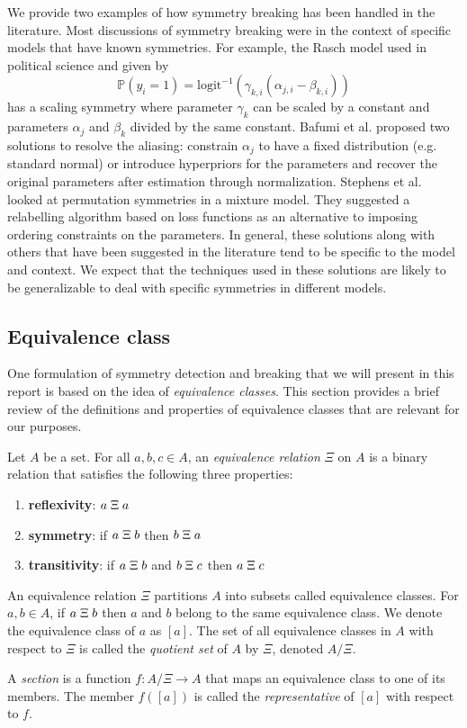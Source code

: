 We provide two examples of how symmetry breaking has been handled in the literature. Most discussions of symmetry breaking were in the context of specific models that have known symmetries. For example, the Rasch model used in political science and given by
\[
\mathbb{P}(y_i=1) = \text{logit}^{-1}\left(\gamma_{k,i}(\alpha_{j,i}-\beta_{k,i})\right)
\]
has a scaling symmetry where parameter $\gamma_k$ can be scaled by a constant and parameters $\alpha_j$ and $\beta_k$ divided by the same constant. Bafumi et al. \cite{Bafumi:2005} proposed two solutions to resolve the aliasing: constrain $\alpha_j$ to have a fixed distribution (e.g. standard normal) or introduce hyperpriors for the parameters and recover the original parameters after estimation through normalization. Stephens et al. \cite{Stephens:2000} looked at permutation symmetries in a mixture model. They suggested a relabelling algorithm based on loss functions as an alternative to imposing ordering constraints on the parameters. In general, these solutions along with others that have been suggested in the literature tend to be specific to the model and context. We expect that the techniques used in these solutions are likely to be generalizable to deal with specific symmetries in different models.


\subsection{Equivalence class}

One formulation of symmetry detection and breaking that we will present in this report is based on the idea of \textit{equivalence classes}. This section provides a brief review of the definitions and properties of equivalence classes that are relevant for our purposes.

\begin{defn}
Let $A$ be a set. For all $a,b,c\in A$, an \textit{equivalence relation} $\Xi$ on $A$ is a binary relation that satisfies the following three properties:
\begin{enumerate}

\item
\textbf{reflexivity}: $a\;\Xi\; a$

\item
\textbf{symmetry}: if $a\;\Xi\; b$ then $b\;\Xi\; a$

\item
\textbf{transitivity}: if $a\;\Xi\; b$ and $b\;\Xi\; c$ then $a\;\Xi\; c$

\end{enumerate}
An equivalence relation $\Xi$ partitions $A$ into subsets called equivalence classes. For $a,b\in A$, if $a\;\Xi\; b$ then $a$ and $b$ belong to the same equivalence class. We denote the equivalence class of $a$ as $[a]$. The set of all equivalence classes in $A$ with respect to $\Xi$ is called the \textit{quotient set} of $A$ by $\Xi$, denoted $A/\Xi$.
\end{defn}

\begin{defn}
A \textit{section} is a function $f:A/\Xi\rightarrow A$ that maps an equivalence class to one of its members. The member $f([a])$ is called the \textit{representative} of $[a]$ with respect to $f$.
\end{defn}

